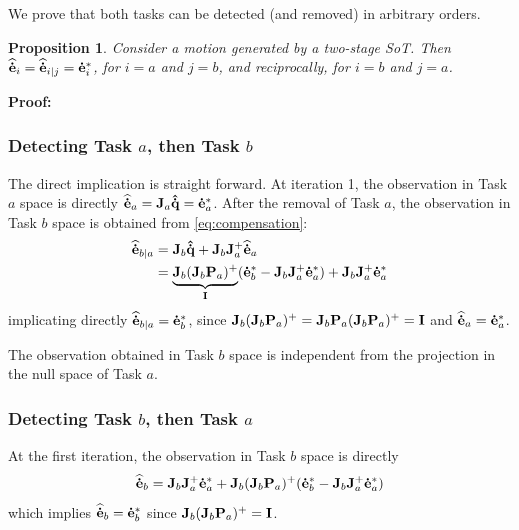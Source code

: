 \documentclass[journal]{IEEEtran}
\newtheorem{proposition}[theorem]{Proposition}
\begin{document}
We prove that both tasks can be detected (and removed)
in arbitrary orders.

\begin{proposition}
  Consider a motion generated by a two-stage SoT. Then
${\mathbf{\widehat{\dot{e}}}}_{i} = {\mathbf{\widehat{\dot{e}}}}_{i|j} = {\mathbf{\dot{e}}}_{i}^*$, for $i=a$ and $j=b$, and reciprocally, for $i=b$ and $j=a$.
\end{proposition}
\noindent\textbf{Proof:}
  \subsubsection{Detecting Task $a$, then Task $b$}
The direct implication is straight forward.
At iteration 1, the observation in Task $a$ space is directly
${\mathbf{\widehat{\dot{e}}}}_{a} = {\mathbf{J}}_a{\mathbf{\hat{\dot{q}}}} = {\mathbf{\dot{e}}}_{a}^*$.
After the removal of Task $a$, the observation in Task $b$ space
is obtained from \eqref{eq:compensation}:
\begin{align*}
 {\mathbf{\widehat{\dot{e}}}}_{b|a} &=  {\mathbf{J}}_b{\mathbf{\hat{\dot{q}}}} +  {\mathbf{J}}_b {\mathbf{J}}_a^+ {\mathbf{\widehat{\dot{e}}}}_{a}\\
 &= \underbrace{{\mathbf{J}}_b({\mathbf{J}}_b {\mathbf{P}}_a)^+}_{{\mathbf{I}}} ({\mathbf{\dot{e}}}_{b}^* - {\mathbf{J}}_b {\mathbf{J}}_a^+{\mathbf{\dot{e}}}_{a}^*) + {\mathbf{J}}_b {\mathbf{J}}_a^+ {\mathbf{\dot{e}}}_{a}^*
\end{align*}
implicating directly ${\mathbf{\widehat{\dot{e}}}}_{b|a}={\mathbf{\dot{e}}}_{b}^*$, since ${\mathbf{J}}_b({\mathbf{J}}_b {\mathbf{P}}_a)^+ = {\mathbf{J}}_b {\mathbf{P}}_a({\mathbf{J}}_b {\mathbf{P}}_a)^+ = {\mathbf{I}}$ and ${\mathbf{\widehat{\dot{e}}}}_{a} = {\mathbf{\dot{e}}}_{a}^*$.

The observation obtained in Task $b$ space is independent from the
projection in the null space of Task $a$.\\

\subsubsection{Detecting Task $b$, then Task $a$}

At the first iteration, the observation in Task $b$ space is directly
\begin{equation*}
{\mathbf{\widehat{\dot{e}}}}_{b}  = {\mathbf{J}}_{b} {\mathbf{J}}_{a}^+ {\mathbf{\dot{e}}}_{a}^* + {\mathbf{J}}_{b} ( {\mathbf{J}}_{b} {\mathbf{P}}_{a} )^+ ( {\mathbf{\dot{e}}}_{b}^* - {\mathbf{J}}_{b} {\mathbf{J}}_{a}^+ {\mathbf{\dot{e}}}_{a}^* )
\end{equation*}
which implies ${\mathbf{\widehat{\dot{e}}}}_{b} = {\mathbf{\dot{e}}}_{b}^*$ since ${\mathbf{J}}_{b} ( {\mathbf{J}}_{b} {\mathbf{P}}_{a} )^+ = {\mathbf{I}}$.
\end{document}
